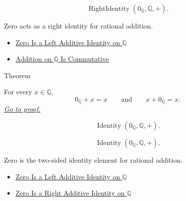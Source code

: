 \begin{remark*}
\[
\operatorname{RightIdentity}(0_{\mathbb{Q}},\mathbb{Q},+).
\]
\end{remark*}

\begin{remark*}[Interpretation]
Zero acts as a right identity for rational addition.
\end{remark*}

\begin{dependencies}
\begin{itemize}
  \item \hyperref[thm:zero-left-additive-identity-on-q]{Zero Is a Left Additive Identity on $\mathbb{Q}$}
  \item \hyperref[thm:addition-on-q-commutative]{Addition on $\mathbb{Q}$ Is Commutative}
\end{itemize}
\end{dependencies}

\begin{theorembox}{Theorem}
\begin{theorem}
\label{thm:zero-additive-identity-on-q}
For every $x\in\mathbb{Q}$,
\[
0_{\mathbb{Q}}+x=x
\qquad\text{and}\qquad
x+0_{\mathbb{Q}}=x.
\]
\hyperref[prf:zero-additive-identity-on-q]{\textit{Go to proof.}}
\end{theorem}
\end{theorembox}

\begin{remark*}
\[
\operatorname{Identity}(0_{\mathbb{Q}},\mathbb{Q},+).
\]
\end{remark*}

\begin{remark*}
\[
\operatorname{Identity}(0_{\mathbb{Q}},\mathbb{Q},+).
\]
\end{remark*}

\begin{remark*}[Interpretation]
Zero is the two-sided identity element for rational addition.
\end{remark*}

\begin{dependencies}
\begin{itemize}
  \item \hyperref[thm:zero-left-additive-identity-on-q]{Zero Is a Left Additive Identity on $\mathbb{Q}$}
  \item \hyperref[cor:zero-right-additive-identity-on-q]{Zero Is a Right Additive Identity on $\mathbb{Q}$}
\end{itemize}
\end{dependencies}

